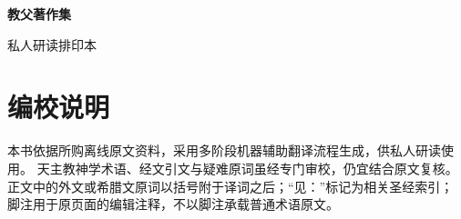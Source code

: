 \frontmatter
\begin{titlepage}
  \centering
  \vspace*{.17\textheight}
  {\bfseries 教父著作集\par}
  \vspace{2.2cm}
  {\bfseries \CollectionVolumeTitle\par}
  \vfill
  {\cfkaishu{}私人研读排印本\par}
  \vspace*{.08\textheight}
\end{titlepage}
\cleardoublepage
\chapter*{编校说明}
本书依据所购离线原文资料，采用多阶段机器辅助翻译流程生成，供私人研读使用。
天主教神学术语、经文引文与疑难原词虽经专门审校，仍宜结合原文复核。
正文中的外文或希腊文原词以括号附于译词之后；“见：”标记为相关圣经索引；
脚注用于原页面的编辑注释，不以脚注承载普通术语原文。
\cleardoublepage
\tableofcontents
\mainmatter
